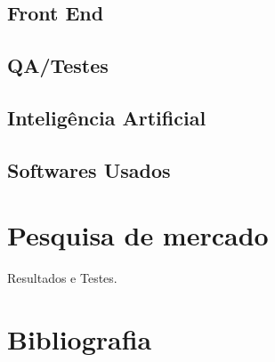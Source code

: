 \documentclass[12pt, a4paper]{article}
\begin{document}
\subsection{Front End}

\subsection{QA/Testes}

\subsection{Inteligência Artificial}

\subsection{Softwares Usados}

\newpage

\section{Pesquisa de mercado}
Resultados e Testes.

\newpage

\section{Bibliografia}
\end{document}
